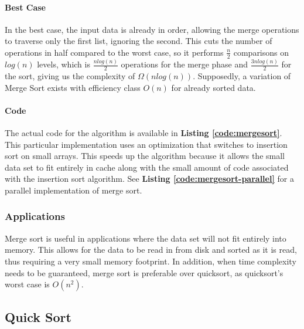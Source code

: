 \documentclass{article}
\begin{document}
        \paragraph{Best Case}
          In the best case, the input data is already in order, allowing the
          merge operations to traverse only the first list, ignoring the second.
          This cuts the number of operations in half compared to the worst
          case, so it performs $\frac{n}{2}$ comparisons on $log(n)$ levels,
          which is $\frac{n log(n)}{2}$ operations for the merge phase and
          $\frac{3n log(n)}{2}$ for the sort, giving us the complexity of
          $\Omega(n log(n))$.  Supposedly, a variation of Merge Sort exists with
          efficiency class $O(n)$ for already sorted data.
        \paragraph{Code}
          The actual code for the algorithm is available in \textbf{Listing
          \ref{code:mergesort}}.  This particular implementation uses an
          optimization that switches to insertion sort on small arrays.  This
          speeds up the algorithm because it allows the small data set to fit
          entirely in cache along with the small amount of code associated with
          the insertion sort algorithm.  See \textbf{Listing
          \ref{code:mergesort-parallel}} for a parallel implementation of merge
          sort.
      \subsubsection{Applications}
        Merge sort is useful in applications where the data set will not fit
        entirely into memory.  This allows for the data to be read in from disk
        and sorted as it is read, thus requiring a very small memory footprint.
        In addition, when time complexity needs to be guaranteed, merge sort is
        preferable over quicksort, as quicksort's worst case is $O(n^2)$.
   \subsection{Quick Sort}
\end{document}
